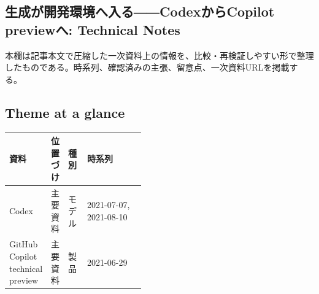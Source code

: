 \subsection*{生成が開発環境へ入る――CodexからCopilot previewへ: Technical Notes}
本欄は記事本文で圧縮した一次資料上の情報を、比較・再検証しやすい形で整理したものである。時系列、確認済みの主張、留意点、一次資料URLを掲載する。
\smallskip
{}\par
\medskip
\subsection*{Theme at a glance}
\begin{center}
\footnotesize
\begin{tabularx}{\linewidth}{@{}p{0.20\linewidth}p{0.10\linewidth}p{0.14\linewidth}X@{}}
\toprule
資料 & 位置づけ & 種別 & 時系列 \\
\midrule
Codex & 主要資料 & モデル & 2021-07-07, 2021-08-10 \\
GitHub Copilot technical preview & 主要資料 & 製品 & 2021-06-29 \\
\bottomrule
\end{tabularx}
\end{center}
\normalsize

